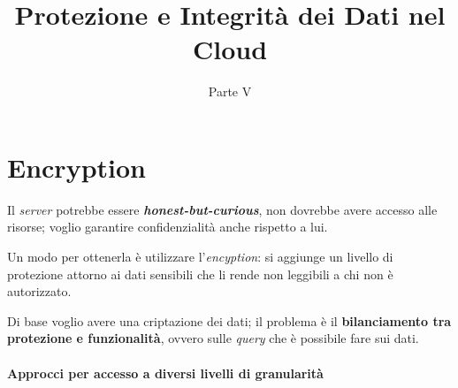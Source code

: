 \documentclass{report}
\title{Protezione e Integrità dei Dati nel Cloud}
\date{Parte V}
\begin{document}
\maketitle

\tableofcontents
\newpage

\chapter{Encryption}
Il \textit{server} potrebbe essere \textbf{\textit{honest-but-curious}}, non dovrebbe 
avere accesso alle risorse; voglio garantire confidenzialità anche rispetto a lui.

Un modo per ottenerla è utilizzare l'\textit{encyption}: si aggiunge 
un livello di protezione attorno ai dati sensibili che li rende non 
leggibili a chi non è autorizzato. 

Di base voglio avere una criptazione dei dati; il problema è il \textbf{bilanciamento tra protezione e funzionalità}, ovvero sulle \textit{query} che è possibile fare sui dati.

\subsubsection{Approcci per accesso a diversi livelli di granularità}
\end{document}
